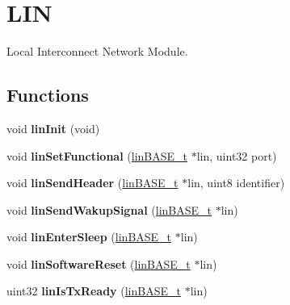\hypertarget{group__LIN}{}\section{L\+IN}
\label{group__LIN}


Local Interconnect Network Module.  


\subsection*{Functions}
\begin{DoxyCompactItemize}
\item 
\mbox{\label{group__LIN_ga2576bee080965072d2443d24ea5e15e8}} 
void {\bfseries lin\+Init} (void)
\item 
\mbox{\label{group__LIN_ga7ec08c4767c36c39f6cfdc7b66b04b3b}} 
void {\bfseries lin\+Set\+Functional} (\mbox{\hyperlink{reg__lin_8h_aaabd72fa55ff1fcbcc2882d92c5ff17e}{lin\+B\+A\+S\+E\+\_\+t}} $\ast$lin, uint32 port)
\item 
\mbox{\label{group__LIN_ga7e04701cc8d181ea2f27e274ecd9ed1b}} 
void {\bfseries lin\+Send\+Header} (\mbox{\hyperlink{reg__lin_8h_aaabd72fa55ff1fcbcc2882d92c5ff17e}{lin\+B\+A\+S\+E\+\_\+t}} $\ast$lin, uint8 identifier)
\item 
\mbox{\label{group__LIN_ga6a3d9db629e41f277b8dcfbd2d517a3d}} 
void {\bfseries lin\+Send\+Wakup\+Signal} (\mbox{\hyperlink{reg__lin_8h_aaabd72fa55ff1fcbcc2882d92c5ff17e}{lin\+B\+A\+S\+E\+\_\+t}} $\ast$lin)
\item 
\mbox{\label{group__LIN_ga2c490fe7fd7c68c3eb6b53eeeca15d78}} 
void {\bfseries lin\+Enter\+Sleep} (\mbox{\hyperlink{reg__lin_8h_aaabd72fa55ff1fcbcc2882d92c5ff17e}{lin\+B\+A\+S\+E\+\_\+t}} $\ast$lin)
\item 
\mbox{\label{group__LIN_ga5669428dc44c88863c01f2406da5b1a0}} 
void {\bfseries lin\+Software\+Reset} (\mbox{\hyperlink{reg__lin_8h_aaabd72fa55ff1fcbcc2882d92c5ff17e}{lin\+B\+A\+S\+E\+\_\+t}} $\ast$lin)
\item 
\mbox{\label{group__LIN_ga2fb025a72d24aa4a036b4a11a97cd97c}} 
uint32 {\bfseries lin\+Is\+Tx\+Ready} (\mbox{\hyperlink{reg__lin_8h_aaabd72fa55ff1fcbcc2882d92c5ff17e}{lin\+B\+A\+S\+E\+\_\+t}} $\ast$lin)

\end{DoxyCompactItemize}
